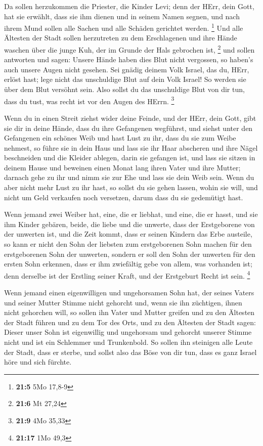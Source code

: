 Da sollen herzukommen die Priester, die Kinder Levi; denn der HErr, dein
Gott, hat sie erwählt, dass sie ihm dienen und in seinem Namen segnen,
und nach ihrem Mund sollen alle Sachen und alle Schäden gerichtet
werden. \footnote{\textbf{21:5} 5Mo 17,8-9}  Und alle
Ältesten der Stadt sollen herzutreten zu dem Erschlagenen und ihre Hände
waschen über die junge Kuh, der im Grunde der Hals gebrochen ist,
\footnote{\textbf{21:6} Mt 27,24}  und sollen antworten und
sagen: Unsere Hände haben dies Blut nicht vergossen, so haben's auch
unsere Augen nicht gesehen.  Sei gnädig deinem Volk Israel,
das du, HErr, erlöst hast; lege nicht das unschuldige Blut auf dein Volk
Israel! So werden sie über dem Blut versöhnt sein.  Also
sollst du das unschuldige Blut von dir tun, dass du tust, was recht ist
vor den Augen des HErrn. \footnote{\textbf{21:9} 4Mo 35,33}

 Wenn du in einen Streit ziehst wider deine Feinde, und der
HErr, dein Gott, gibt sie dir in deine Hände, dass du ihre Gefangenen
wegführst,  und siehst unter den Gefangenen ein schönes
Weib und hast Lust zu ihr, dass du sie zum Weibe nehmest, 
so führe sie in dein Haus und lass sie ihr Haar abscheren und ihre Nägel
beschneiden  und die Kleider ablegen, darin sie gefangen
ist, und lass sie sitzen in deinem Hause und beweinen einen Monat lang
ihren Vater und ihre Mutter; darnach gehe zu ihr und nimm sie zur Ehe
und lass sie dein Weib sein.  Wenn du aber nicht mehr Lust
zu ihr hast, so sollst du sie gehen lassen, wohin sie will, und nicht um
Geld verkaufen noch versetzen, darum dass du sie gedemütigt hast.

 Wenn jemand zwei Weiber hat, eine, die er liebhat, und
eine, die er hasst, und sie ihm Kinder gebären, beide, die liebe und die
unwerte, dass der Erstgeborene von der unwerten ist,  und
die Zeit kommt, dass er seinen Kindern das Erbe austeile, so kann er
nicht den Sohn der liebsten zum erstgeborenen Sohn machen für den
erstgeborenen Sohn der unwerten,  sondern er soll den Sohn
der unwerten für den ersten Sohn erkennen, dass er ihm zwiefältig gebe
von allem, was vorhanden ist; denn derselbe ist der Erstling seiner
Kraft, und der Erstgeburt Recht ist sein. \footnote{\textbf{21:17} 1Mo
  49,3}

 Wenn jemand einen eigenwilligen und ungehorsamen Sohn hat,
der seines Vaters und seiner Mutter Stimme nicht gehorcht und, wenn sie
ihn züchtigen, ihnen nicht gehorchen will,  so sollen ihn
Vater und Mutter greifen und zu den Ältesten der Stadt führen und zu dem
Tor des Orts,  und zu den Ältesten der Stadt sagen: Dieser
unser Sohn ist eigenwillig und ungehorsam und gehorcht unserer Stimme
nicht und ist ein Schlemmer und Trunkenbold.  So sollen ihn
steinigen alle Leute der Stadt, dass er sterbe, und sollst also das Böse
von dir tun, dass es ganz Israel höre und sich fürchte.

